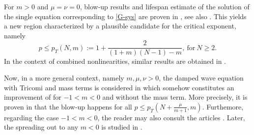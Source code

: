 \documentclass[12pt,leqno]{amsart}
\numberwithin{equation}{section}
\theoremstyle{remark}
\begin{document}
For $m>0$ and $\mu=\nu=0$,   blow-up results and lifespan estimate of the solution  of the single equation corresponding to \eqref{G-sys} are proven in \cite{Lai2020}, see also \cite{LP-Tricomi}. This yields a new  region characterized by a plausible candidate for the critical exponent, namely  
\begin{equation}\label{pT}
p \le p_T(N,m):=1+\frac{2}{(1+m)(N-1)-m}, \ \text{for} \ N \ge 2.
\end{equation}
In the context of combined nonlinearities, similar results  are obtained in \cite{CLP,Our5}.

Now, in a more general context, namely $m,\mu,\nu>0$, the damped wave equation with Tricomi and mass terms is considered  in \cite{Our8}  which somehow constitutes an improvement of \cite{HHP1,HHP2} for $-1<m<0$ and without the mass term. More precisely, it is proven in \cite{Our8} that the blow-up happens for all $p \le p_T(N+\frac{\mu}{m+1},m)$. Furthemore, regarding the case $-1<m<0$, the reader may also consult the articles \cite{Palmieri, Palmieri2, Tsutaya}. Later, the spreading out to any $m<0$ is studied in \cite{Tsutaya3, Tsutaya2}. \\
\end{document}
